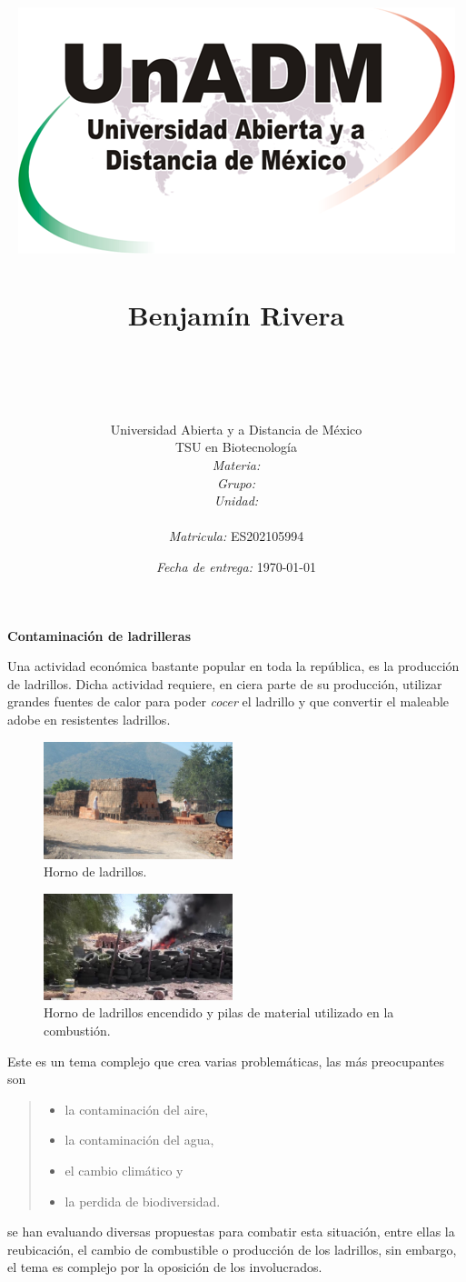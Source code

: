 \documentclass[12pt]{article}
\title{
	\includegraphics{../../../assets/logo-unadm} \\
	\ \\ Benjam\'in Rivera \\
	\bf{\titulo}\\\ \\}
\author{
	Universidad Abierta y a Distancia de México \\
	TSU en Biotecnolog\'ia \\
	\textit{Materia:} \materia \\
	\textit{Grupo:} \grupo \\
	\textit{Unidad:} \unidad \\
	\\
	\textit{Matricula:} ES202105994 }
\date{\textit{Fecha de entrega:} \today}
\begin{document}
\maketitle\newpage

	\begin{center}\par\bf\huge Contaminaci\'on de ladrilleras
	\end{center}
	
	\par Una actividad econ\'omica bastante popular en toda la rep\'ublica, es la producci\'on de ladrillos. Dicha actividad requiere, en ciera parte de su producci\'on, utilizar grandes fuentes de calor para poder \textit{cocer} el ladrillo y que convertir el maleable adobe en resistentes ladrillos. 

	\begin{figure}[h]
		\centering
		\includegraphics [width=0.49\textwidth] {quema_ladrillos.jpg}
		\caption{Horno de ladrillos.}
	\end{figure}

	\begin{figure}[h]
		\centering
		\includegraphics [width=0.49\textwidth] {fuego_ladrillos.jpg}
		\caption{Horno de ladrillos encendido y pilas de material utilizado en la combusti\'on.}
	\end{figure}


	\par Este es un tema complejo que crea varias problem\'aticas, las m\'as preocupantes son  

	\begin{quote}\begin{itemize}
		\item la contaminaci\'on del aire,
		\item la contaminaci\'on del agua, 
		\item el cambio clim\'atico y
		\item la perdida de biodiversidad.
	\end{itemize}\end{quote}
	se han evaluando diversas propuestas para combatir esta situación, entre ellas la reubicación, el cambio de combustible o producción de los ladrillos, sin embargo, el tema es complejo por la oposición de los involucrados.
	
\end{document}
